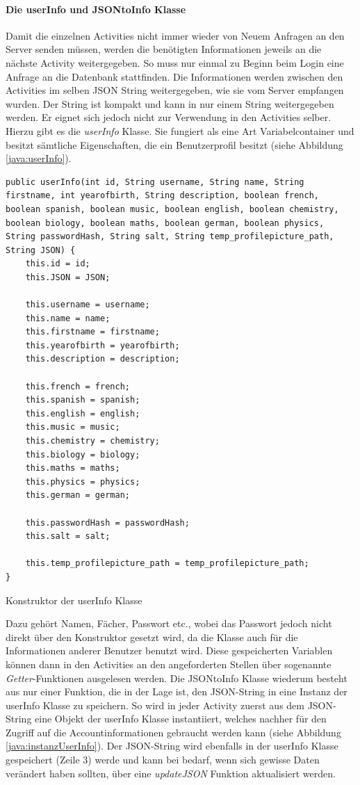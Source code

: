 \documentclass[a4paper,11pt]{report}
\newenvironment{code}{\captionsetup{type=figure}}{}
\begin{document}
				\paragraph{Die userInfo und JSONtoInfo Klasse} \label{userInfo}
				Damit die einzelnen Activities nicht immer wieder von Neuem Anfragen an den Server senden müssen, werden die benötigten Informationen jeweils an die nächste Activity weitergegeben. So muss nur einmal zu Beginn beim Login eine Anfrage an die Datenbank stattfinden. Die Informationen werden zwischen den Activities im selben JSON String weitergegeben, wie sie vom Server empfangen wurden. Der String ist kompakt und kann in nur einem String weitergegeben werden. Er eignet sich jedoch nicht zur Verwendung in den Activities selber. Hierzu gibt es die \emph{userInfo} Klasse. Sie fungiert als eine Art \glqq Variabelcontainer\grqq{} und besitzt sämtliche Eigenschaften, die ein Benutzerprofil besitzt (siehe Abbildung \ref{java:userInfo}).
\begin{code}
	\begin{center}
		\begin{verbatim}
public userInfo(int id, String username, String name, String firstname, int yearofbirth, String description, boolean french, boolean spanish, boolean music, boolean english, boolean chemistry, boolean biology, boolean maths, boolean german, boolean physics, String passwordHash, String salt, String temp_profilepicture_path, String JSON) {
	this.id = id;
	this.JSON = JSON;
	
	this.username = username;
	this.name = name;
	this.firstname = firstname;
	this.yearofbirth = yearofbirth;
	this.description = description;
	
	this.french = french;
	this.spanish = spanish;
	this.english = english;
	this.music = music;
	this.chemistry = chemistry;
	this.biology = biology;
	this.maths = maths;
	this.physics = physics;
	this.german = german;
	
	this.passwordHash = passwordHash;
	this.salt = salt;
	
	this.temp_profilepicture_path = temp_profilepicture_path;
}
		\end{verbatim}
	\caption{Konstruktor der userInfo Klasse}\label{java:userInfo}
	\end{center}
\end{code}
				Dazu gehört Namen, Fächer, Passwort etc., wobei das Passwort jedoch nicht direkt über den Konstruktor gesetzt wird, da die Klasse auch für die Informationen anderer Benutzer benutzt wird. Diese gespeicherten Variablen können dann in den Activities an den angeforderten Stellen über sogenannte \emph{Getter}-Funktionen ausgelesen werden. Die JSONtoInfo Klasse wiederum besteht aus nur einer Funktion, die in der Lage ist, den JSON-String in eine Instanz der userInfo Klasse zu speichern. So wird in jeder Activity zuerst aus dem JSON-String eine Objekt der userInfo Klasse instantiiert, welches nachher für den Zugriff auf die Accountinformationen gebraucht werden kann (siehe Abbildung \ref{java:instanzUserInfo}). Der JSON-String wird ebenfalls in der userInfo Klasse gespeichert (Zeile 3) werde und kann bei bedarf, wenn sich gewisse Daten verändert haben sollten, über eine \emph{updateJSON} Funktion aktualisiert werden.
\end{document}
